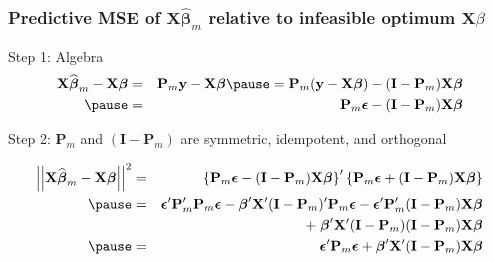 \begin{frame}
  \frametitle{Predictive MSE of $\mathbf{X}\widehat{\boldsymbol{\beta}}_m$ relative to infeasible optimum $\boldsymbol{X}\beta$}


  \begin{block}{\small Step 1: Algebra}
    \vspace{-1em}
    \small
    \begin{eqnarray*}
      \mathbf{X}\widehat{\boldsymbol{\beta}}_m - \mathbf{X}\boldsymbol{\beta} &=& \mathbf{P}_m \mathbf{y} - \mathbf{X}\boldsymbol{\beta} \pause =  \mathbf{P}_m(\mathbf{y}-\mathbf{X}\boldsymbol{\beta}) - (\mathbf{I} - \mathbf{P}_m)\mathbf{X}\boldsymbol{\beta} \\ \pause
  &=& \mathbf{P}_m \boldsymbol{\epsilon} - (\mathbf{I}- \mathbf{P}_m)\mathbf{X}\boldsymbol{\beta}
    \end{eqnarray*}
  \end{block}

  \pause
  \vspace{-1em}

  \begin{block}{\small Step 2: $\mathbf{P}_m$ and $(\mathbf{I} - \mathbf{P}_m)$ are symmetric, idempotent, and orthogonal} 
    \small

    \vspace{-1em}
\begin{eqnarray*}
  \left|\left|\mathbf{X}\widehat{\boldsymbol{\beta}}_m - \mathbf{X}\boldsymbol{\beta}\right|\right|^2 &=&\left\{ \mathbf{P}_m \boldsymbol{\epsilon} - (\mathbf{I}- \mathbf{P}_m)\mathbf{X}\boldsymbol{\beta}\right\}'\left\{ \mathbf{P}_m \boldsymbol{\epsilon} + (\mathbf{I}- \mathbf{P}_m)\mathbf{X}\boldsymbol{\beta} \right\}\\ \pause
  &=&\boldsymbol{\epsilon}'\mathbf{P}_m'\mathbf{P}_m \boldsymbol{\epsilon} - \boldsymbol{\beta}'\mathbf{X}'(\mathbf{I}-\mathbf{P}_m)'\mathbf{P}_m\boldsymbol{\epsilon} - \boldsymbol{\epsilon}'\mathbf{P}_m'(\mathbf{I} - \mathbf{P}_m)\mathbf{X}\boldsymbol{\beta}\\
  &&\quad \quad + \; \boldsymbol{\beta}'\mathbf{X}' (\mathbf{I} - \mathbf{P}_m)(\mathbf{I} - \mathbf{P}_m)\mathbf{X}\boldsymbol{\beta}\\ \pause
  &=& \boldsymbol{\epsilon}'\mathbf{P}_m \boldsymbol{\epsilon} + \boldsymbol{\beta}'\mathbf{X}'(\mathbf{I} - \mathbf{P}_m)\mathbf{X}\boldsymbol{\beta}
\end{eqnarray*}
  \end{block}

\end{frame}
